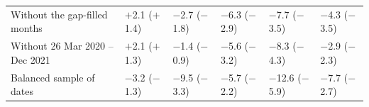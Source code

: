 \begin{longtable}{L{3.8cm} C{2.2cm} C{2.2cm} C{2.2cm} C{2.2cm} C{2.2cm}}
Without the gap-filled months & $+$2.1 {\scriptsize($+$1.4)} & $-$2.7 {\scriptsize($-$1.8)} & $-$6.3 {\scriptsize($-$2.9)} & $-$7.7 {\scriptsize($-$3.5)} & $-$4.3 {\scriptsize($-$3.5)} \\
Without 26 Mar 2020 -- Dec 2021 & $+$2.1 {\scriptsize($+$1.3)} & $-$1.4 {\scriptsize($-$0.9)} & $-$5.6 {\scriptsize($-$3.2)} & $-$8.3 {\scriptsize($-$4.3)} & $-$2.9 {\scriptsize($-$2.3)} \\
Balanced sample of dates & $-$3.2 {\scriptsize($-$1.3)} & $-$9.5 {\scriptsize($-$3.3)} & $-$5.7 {\scriptsize($-$2.2)} & $-$12.6 {\scriptsize($-$5.9)} & $-$7.7 {\scriptsize($-$2.7)} \\
\end{longtable}
\endgroup
